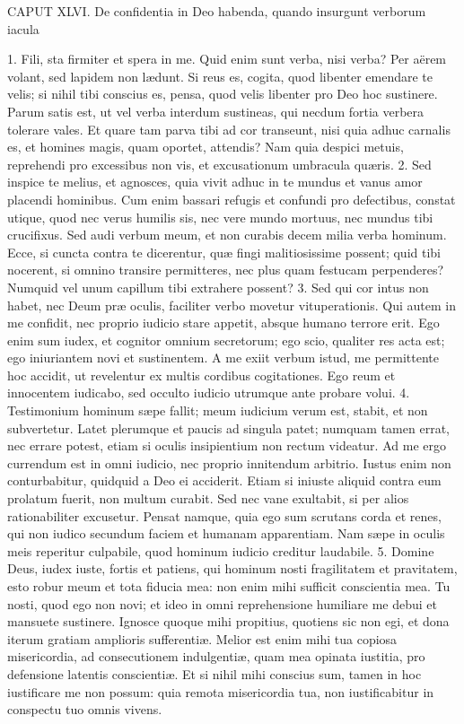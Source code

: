 \documentclass[twoside]{article}
\begin{document}
CAPUT XLVI.
De confidentia in Deo habenda, quando insurgunt verborum iacula

1. Fili, sta firmiter et spera in me. Quid enim sunt verba, nisi verba? Per aërem volant, sed lapidem non lædunt. Si reus es, cogita, quod libenter emendare te velis; si nihil tibi conscius es, pensa, quod velis libenter pro Deo hoc sustinere. Parum satis est, ut vel verba interdum sustineas, qui necdum fortia verbera tolerare vales. Et quare tam parva tibi ad cor transeunt, nisi quia adhuc carnalis es, et homines magis, quam oportet, attendis? Nam quia despici metuis, reprehendi pro excessibus non vis, et excusationum umbracula quæris.
2. Sed inspice te melius, et agnosces, quia vivit adhuc in te mundus et vanus amor placendi hominibus. Cum enim bassari refugis et confundi pro defectibus, constat utique, quod nec verus humilis sis, nec vere mundo mortuus, nec mundus tibi crucifixus. Sed audi verbum meum, et non curabis decem milia verba hominum. Ecce, si cuncta contra te dicerentur, quæ fingi malitiosissime possent; quid tibi nocerent, si omnino transire permitteres, nec plus quam festucam perpenderes? Numquid vel unum capillum tibi extrahere possent?
3. Sed qui cor intus non habet, nec Deum præ oculis, faciliter verbo movetur vituperationis. Qui autem in me confidit, nec proprio iudicio stare appetit, absque humano terrore erit. Ego enim sum iudex, et cognitor omnium secretorum; ego scio, qualiter res acta est; ego iniuriantem novi et sustinentem. A me exiit verbum istud, me permittente hoc accidit, ut revelentur ex multis cordibus cogitationes. Ego reum et innocentem iudicabo, sed occulto iudicio utrumque ante probare volui.
4. Testimonium hominum sæpe fallit; meum iudicium verum est, stabit, et non subvertetur. Latet plerumque et paucis ad singula patet; numquam tamen errat, nec errare potest, etiam si oculis insipientium non rectum videatur. Ad me ergo currendum est in omni iudicio, nec proprio innitendum arbitrio. Iustus enim non conturbabitur, quidquid a Deo ei acciderit. Etiam si iniuste aliquid contra eum prolatum fuerit, non multum curabit. Sed nec vane exultabit, si per alios rationabiliter excusetur. Pensat namque, quia ego sum scrutans corda et renes, qui non iudico secundum faciem et humanam apparentiam. Nam sæpe in oculis meis reperitur culpabile, quod hominum iudicio creditur laudabile.
5. Domine Deus, iudex iuste, fortis et patiens, qui hominum nosti fragilitatem et pravitatem, esto robur meum et tota fiducia mea: non enim mihi sufficit conscientia mea. Tu nosti, quod ego non novi; et ideo in omni reprehensione humiliare me debui et mansuete sustinere. Ignosce quoque mihi propitius, quotiens sic non egi, et dona iterum gratiam amplioris sufferentiæ. Melior est enim mihi tua copiosa misericordia, ad consecutionem indulgentiæ, quam mea opinata iustitia, pro defensione latentis conscientiæ. Et si nihil mihi conscius sum, tamen in hoc iustificare me non possum: quia remota misericordia tua, non iustificabitur in conspectu tuo omnis vivens.
\end{document}
